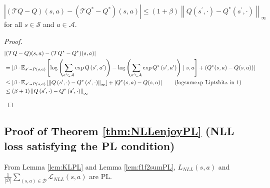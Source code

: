 \begin{lem}\label{lem:smoothBellman} $|(\mathcal{T}Q-Q)(s,a)-(\mathcal{T}Q^\ast-Q^\ast)(s,a)| \le (1+\beta)\left\|Q\left(s^{\prime}, \cdot\right)-Q^*\left(s^{\prime}, \cdot\right)\right\|_{\infty}$ for all $s\in\mathcal{S}$ and $a\in\mathcal{A}$.
\end{lem}
\begin{proof}

   \begin{align}
       &|(\mathcal{T}Q-Q)(s,a)-(\mathcal{T}Q^\ast-Q^\ast)(s,a)| \notag
       \\
       &=|\beta \cdot \mathbb{E}_{s^{\prime} \sim P(s, a)}\left[\log \left(\sum_{a^{\prime} \in \mathcal{A}} \exp Q\left(s^{\prime}, a^{\prime}\right)\right)-\log \left(\sum_{a^{\prime} \in \mathcal{A}} \exp Q^\ast\left(s^{\prime}, a^{\prime}\right)\right)  \mid s, a\right] +(Q^\ast(s, a)-Q(s, a))|\notag
       \\
       &\le|\beta \cdot \mathbb{E}_{s^{\prime} \sim P(s, a)}\left[\left\|Q\left(s^{\prime}, \cdot\right)-Q^*\left(s^{\prime}, \cdot\right)\right\|_{\infty}\right] + \left|Q^*(s, a)-Q(s, a)\right| \tag{logsumexp Liptshitz in 1}
       \\
       &\le(\beta+1)\left\|Q\left(s^{\prime}, \cdot\right)-Q^*\left(s^{\prime}, \cdot\right)\right\|_{\infty}\notag
   \end{align}
\end{proof}




\subsection{Proof of Theorem \ref{thm:NLLenjoyPL} (NLL loss satisfying the PL condition)}
From Lemma \ref{lem:KLPL} and Lemma \ref{lem:f1f2sumPL}, ${L}_{NLL}(s,a)$ and $\frac{1}{|\mathcal{D}|}\sum_{(s,a)\in\mathcal{D}}\mathcal{L}_{NLL}(s,a)$ are PL. 

